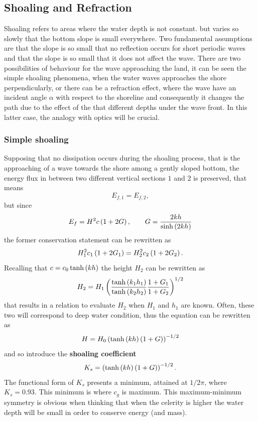 \subsection{Shoaling and Refraction}\label{RefractionShoaling}
Shoaling refers to areas where the water depth is not constant. but varies so slowly that the bottom slope is small everywhere. Two fundamental assumptions are that the slope is so small that no reflection occurs for short periodic waves and that the slope is so small that it does not affect the wave. There are two possibilities of behaviour for the wave approaching the land, it can be seen the simple shoaling phenomena, when the water waves approaches the shore perpendicularly, or there can be a refraction effect, where the wave have an incident angle $\alpha$ with respect to the shoreline and consequently it changes the path due to the effect of the that different depths under the wave front. In this latter case, the analogy with optics will be crucial. 
\subsubsection*{Simple shoaling}
Supposing that no dissipation occurs during the shoaling process, that is the approaching of a wave towards the shore among a gently sloped bottom, the energy flux in between two different vertical sections $1$ and $2$ is preserved, that means
\begin{equation*}
E_{f,1}=E_{f,2},
\end{equation*}
but since
\begin{equation*}
E_{f}=H^{2}c\left( 1+2G \right), \qquad G=\dfrac{2kh}{\sinh\left( 2kh \right)}
\end{equation*}
the former conservation statement can be rewritten as
\begin{equation*}
H_{1}^{2}c_{1}\left( 1+2G_{1} \right)=H_{2}^{2}c_{2}\left( 1+2G_{2} \right).
\end{equation*}
Recalling that $c=c_{0}\tanh\left( kh \right)$ the height $H_{2}$ can be rewritten as
\begin{equation*}
H_{2}=H_{1}\left( \dfrac{\tanh\left( k_{1}h_{1} \right)}{\tanh\left( k_{2}h_{2} \right)}\dfrac{1+G_{1}}{1+G_{2}} \right)^{1/2}
\end{equation*}
that results in a relation to evaluate $H_{2}$ when $H_{1}$ and $h_{1}$ are known. Often, these two will correspond to deep water condition, thus the equation can be rewritten as
\begin{equation}
H=H_{0}\left( \tanh\left( kh \right)\left( 1+G \right) \right)^{-1/2}
\end{equation}
and so introduce the \textbf{shoaling coefficient}
\begin{equation}
K_{s}=\left( \tanh\left( kh \right)\left( 1+G \right) \right)^{-1/2}.
\end{equation}
The functional form of $K_{s}$ presents a minimum, attained at $1/2\pi$, where $K_{s}=0.93$. This minimum is where $c_{g}$ is maximum. This maximum-minimum symmetry is obvious when thinking that when the celerity is higher the water depth will be small in order to conserve energy (and mass). 
